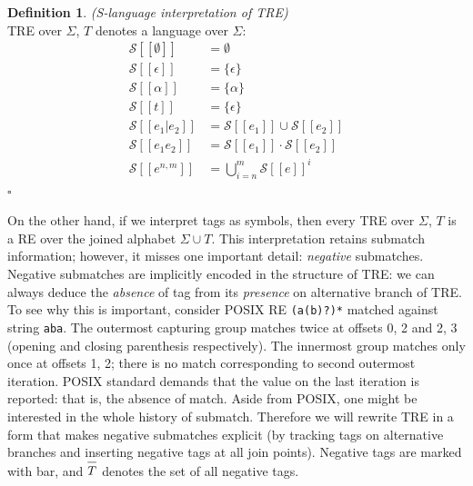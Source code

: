 \documentclass{article}
\newcommand{\Xlb}{[\![}
\newcommand{\Xrb}{]\!]}
\newcommand{\XS}{\mathcal{S}}
\newcommand*{\Xbar}[1]{\overline{#1\vphantom{\bar{#1}}}}
\theoremstyle{definition}
\newtheorem{Xdef}{Definition}
\begin{document}
\begin{multicols}{2}
    \begin{Xdef}\label{defslang}
    \emph{(S-language interpretation of TRE)} \\
    TRE over $\Sigma$, $T$ denotes a language over $\Sigma$:
    \begin{align*}
        \XS \Xlb \emptyset \Xrb &= \emptyset \\
        \XS \Xlb \epsilon \Xrb &= \{ \epsilon \} \\
        \XS \Xlb \alpha \Xrb &= \{\alpha\} \\
        \XS \Xlb t \Xrb &= \{\epsilon\} \\
        \XS \Xlb e_1 | e_2 \Xrb &= \XS \Xlb e_1 \Xrb \cup \XS \Xlb e_2 \Xrb \\
        \XS \Xlb e_1 e_2 \Xrb &= \XS \Xlb e_1 \Xrb \cdot \XS \Xlb e_2 \Xrb \\
        \XS \Xlb e^{n,m} \Xrb &= \bigcup\limits_{i=n}^m \XS \Xlb e \Xrb ^i
    \end{align*}
    $\square$
    \end{Xdef}

On the other hand, if we interpret tags as symbols, then every TRE over $\Sigma$, $T$ is a RE over the joined alphabet $\Sigma \cup T$.
This interpretation retains submatch information; however, it misses one important detail: \emph{negative} submatches.
Negative submatches are implicitly encoded in the structure of TRE:
we can always deduce the \emph{absence} of tag from its \emph{presence} on alternative branch of TRE.
To see why this is important, consider POSIX RE \texttt{(a(b)?)*} matched against string \texttt{aba}.
The outermost capturing group matches twice at offsets 0, 2 and 2, 3 (opening and closing parenthesis respectively).
The innermost group matches only once at offsets 1, 2; there is no match corresponding to second outermost iteration.
POSIX standard demands that the value on the last iteration is reported: that is, the absence of match.
Aside from POSIX, one might be interested in the whole history of submatch.
Therefore we will rewrite TRE in a form that makes negative submatches explicit
(by tracking tags on alternative branches and inserting negative tags at all join points).
Negative tags are marked with bar, and $\Xbar{T}$ denotes the set of all negative tags.


\end{multicols}
\end{document}
